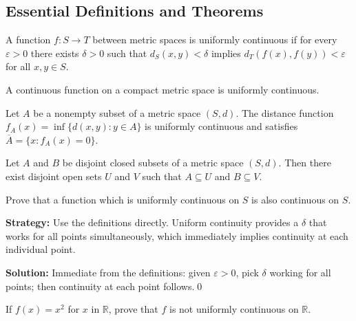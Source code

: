 \subsection*{Essential Definitions and Theorems}

\begin{definition}
A function $f: S \to T$ between metric spaces is uniformly continuous if for every $\varepsilon > 0$ there exists $\delta > 0$ such that $d_S(x,y) < \delta$ implies $d_T(f(x), f(y)) < \varepsilon$ for all $x,y \in S$.
\end{definition}

\begin{theorem}
A continuous function on a compact metric space is uniformly continuous.
\end{theorem}

\begin{theorem}
Let $A$ be a nonempty subset of a metric space $(S,d)$. The distance function $f_A(x) = \inf\{d(x,y) : y \in A\}$ is uniformly continuous and satisfies $\overline{A} = \{x : f_A(x) = 0\}$.
\end{theorem}

\begin{theorem}
Let $A$ and $B$ be disjoint closed subsets of a metric space $(S,d)$. Then there exist disjoint open sets $U$ and $V$ such that $A \subseteq U$ and $B \subseteq V$.
\end{theorem}



\begin{problembox}
Prove that a function which is uniformly continuous on $S$ is also continuous on $S$.
\end{problembox}

\noindent\textbf{Strategy:} Use the definitions directly. Uniform continuity provides a $\delta$ that works for all points simultaneously, which immediately implies continuity at each individual point.

\bigskip\noindent\textbf{Solution:}
Immediate from the definitions: given $\varepsilon>0$, pick $\delta$ working for all points; then continuity at each point follows.\qed



\begin{problembox}
If $f(x) = x^2$ for $x$ in $\mathbb{R}$, prove that $f$ is not uniformly continuous on $\mathbb{R}$.
\end{problembox}

